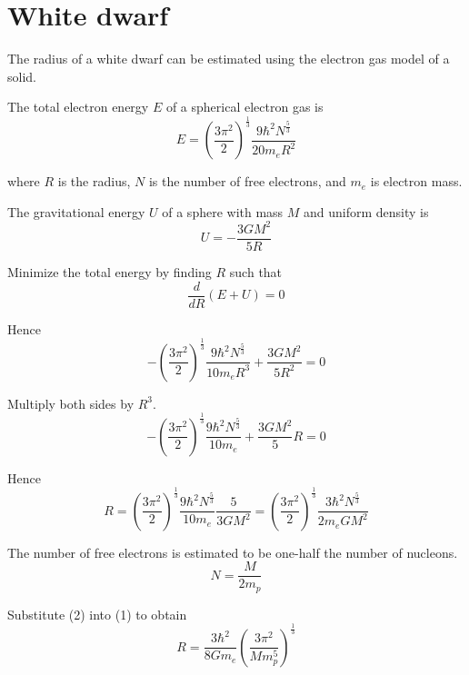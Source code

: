 


\section*{White dwarf}

The radius of a white dwarf can be estimated using the electron gas model of a solid.

\bigskip
The total electron energy $E$ of a spherical electron gas is
\begin{equation*}
E=\left(\frac{3\pi^2}{2}\right)^\frac{1}{3}
\frac{9\hbar^2N^\frac{5}{3}}{20m_eR^2}
\end{equation*}

where $R$ is the radius, $N$ is the number of free electrons, and $m_e$ is electron mass.

\bigskip
The gravitational energy $U$ of a sphere with mass $M$ and uniform density is
\begin{equation*}
U=-\frac{3GM^2}{5R}
\end{equation*}

Minimize the total energy by finding $R$ such that
\begin{equation*}
\frac{d}{dR}(E+U)=0
\end{equation*}

Hence
\begin{equation*}
-\left(\frac{3\pi^2}{2}\right)^\frac{1}{3}
\frac{9\hbar^2N^\frac{5}{3}}{10m_eR^3}+\frac{3GM^2}{5R^2}=0
\end{equation*}

Multiply both sides by $R^3$.
\begin{equation*}
-\left(\frac{3\pi^2}{2}\right)^\frac{1}{3}
\frac{9\hbar^2N^\frac{5}{3}}{10m_e}+\frac{3GM^2}{5}R=0
\end{equation*}

Hence
\begin{equation*}
R=\left(\frac{3\pi^2}{2}\right)^\frac{1}{3}
\frac{9\hbar^2N^\frac{5}{3}}{10m_e}
\frac{5}{3GM^2}
=\left(\frac{3\pi^2}{2}\right)^\frac{1}{3}
\frac{3\hbar^2N^\frac{5}{3}}{2m_eGM^2}
\tag{1}
\end{equation*}

The number of free electrons is estimated to be one-half the number of nucleons.
\begin{equation*}
N=\frac{M}{2m_p}\tag{2}
\end{equation*}

Substitute (2) into (1) to obtain
\begin{equation*}
R=\frac{3\hbar^2}{8Gm_e}\left(\frac{3\pi^2}{Mm_p^5}\right)^\frac{1}{3}\tag{3}
\end{equation*}


